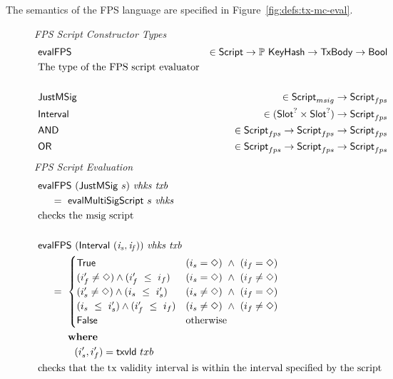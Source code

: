 The semantics of the FPS language are specified in Figure~\ref{fig:defs:tx-mc-eval}.

\begin{figure*}[htb]
  \emph{FPS Script Constructor Types}
  \begin{align*}
    & \mathsf{evalFPS} & \in\mathsf{Script}\to \mathbb{P}~\mathsf{KeyHash}\to\mathsf{TxBody}\to\mathsf{Bool} & \\
    & \text{The type of the FPS script evaluator} \\~\\
    & \mathsf{JustMSig} & \in \mathsf{Script}_{msig} \to \mathsf{Script}_{fps} & \\
    & \mathsf{Interval} & \in (\mathsf{Slot}^? \times \mathsf{Slot}^?) \to \mathsf{Script}_{fps} &\\
    & \mathsf{AND} & \in \mathsf{Script}_{fps} \to \mathsf{Script}_{fps} \to \mathsf{Script}_{fps} & \\
    & \mathsf{OR} & \in \mathsf{Script}_{fps} \to \mathsf{Script}_{fps} \to \mathsf{Script}_{fps} & \\
  \end{align*}
  \emph{FPS Script Evaluation}
  \begin{align*}
    & \fun{evalFPS}  ~(\type{JustMSig}~s)~\var{vhks}~\var{txb} \\
    &~~~~ =~ \fun{evalMultiSigScript}~s~\var{vhks} \\
    & \text {checks the msig script}\\~\\
    & \fun{evalFPS} ~(\type{Interval}~\var{(i_s, i_f)})~\var{vhks}~\var{txb} \\
    &~~~~ =~
    \begin{cases}
      \True & (i_s = \Nothing)~\wedge~(i_f = \Nothing) \\
      (i_f' \neq \Nothing) \wedge (i_f'~\leq~i_f) & (i_s = \Nothing)~\wedge~(i_f \neq \Nothing) \\
      (i_s' \neq \Nothing) \wedge (i_s~\leq~i_s') & (i_s \neq \Nothing)~\wedge~(i_f = \Nothing)\\
      (i_s~\leq~i_s') \wedge (i_f'~\leq~i_f) & (i_s \neq \Nothing)~\wedge~(i_f \neq \Nothing) \\
      \False & \text{otherwise} \\
    \end{cases} \\
    &~~~~~~~ \where \\
    &~~~~~~~~~~~ (i_s', i_f') = \fun{txvld}~{txb} \\
    & \text {checks that the tx validity interval is within the interval specified by the script}\\~\\

\end{align*}
\end{figure*}
